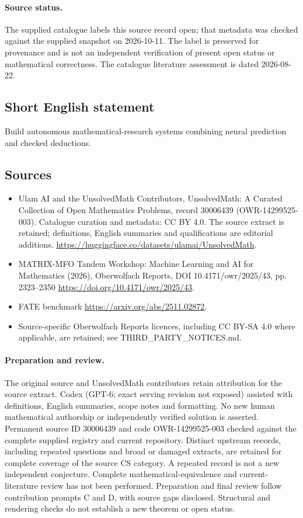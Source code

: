 \documentclass[11pt]{article}
\begin{document}
\paragraph{Source status.}
The supplied catalogue labels this source record open; that metadata was checked against the supplied snapshot on 2026-10-11. The label is preserved for provenance and is not an independent verification of present open status or mathematical correctness. The catalogue literature assessment is dated 2026-08-22.
\subsection{Short English statement}
Build autonomous mathematical-research systems combining neural prediction and checked deductions.
\subsection{Sources}
\begin{itemize}
\item[S1] Ulam AI and the UnsolvedMath Contributors, UnsolvedMath: A Curated Collection of Open Mathematics Problems, record 30006439 (OWR-14299525-003). Catalogue curation and metadata: CC BY 4.0. The source extract is retained; definitions, English summaries and qualifications are editorial additions.
\url{https://huggingface.co/datasets/ulamai/UnsolvedMath}.
\item[S2] MATRIX-MFO Tandem Workshop: Machine Learning and AI for Mathematics (2026), Oberwolfach Reports, DOI 10.4171/owr/2025/43, pp. 2323--2350
\url{https://doi.org/10.4171/owr/2025/43}.
\item[S3] FATE benchmark
\url{https://arxiv.org/abs/2511.02872}.
\item Source-specific Oberwolfach Reports licences, including CC BY-SA 4.0 where applicable, are retained; see THIRD\_PARTY\_NOTICES.md.
\end{itemize}
\paragraph{Preparation and review.}
The original source and UnsolvedMath contributors retain attribution for the source extract. Codex (GPT-6; exact serving revision not exposed) assisted with definitions, English summaries, scope notes and formatting. No new human mathematical authorship or independently verified solution is asserted. Permanent source ID 30006439 and code OWR-14299525-003 checked against the complete supplied registry and current repository. Distinct upstream records, including repeated questions and broad or damaged extracts, are retained for complete coverage of the source CS category. A repeated record is not a new independent conjecture. Complete mathematical-equivalence and current-literature review has not been performed. Preparation and final review follow contribution prompts C and D, with source gaps disclosed. Structural and rendering checks do not establish a new theorem or open status.
\label{end:30006439}
\end{document}
